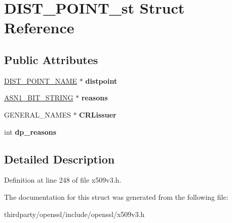\hypertarget{struct_d_i_s_t___p_o_i_n_t__st}{}\section{D\+I\+S\+T\+\_\+\+P\+O\+I\+N\+T\+\_\+st Struct Reference}
\label{struct_d_i_s_t___p_o_i_n_t__st}
\subsection*{Public Attributes}
\begin{DoxyCompactItemize}
\item 
\mbox{\label{struct_d_i_s_t___p_o_i_n_t__st_a8c519036ea9d52503225c5417b6239b8}} 
\hyperlink{struct_d_i_s_t___p_o_i_n_t___n_a_m_e__st}{D\+I\+S\+T\+\_\+\+P\+O\+I\+N\+T\+\_\+\+N\+A\+ME} $\ast$ {\bfseries distpoint}
\item 
\mbox{\label{struct_d_i_s_t___p_o_i_n_t__st_adadc29440678f7d0df1f8fb9319ba87c}} 
\hyperlink{structasn1__string__st}{A\+S\+N1\+\_\+\+B\+I\+T\+\_\+\+S\+T\+R\+I\+NG} $\ast$ {\bfseries reasons}
\item 
\mbox{\label{struct_d_i_s_t___p_o_i_n_t__st_a9dd08da439a604af4d6bc6cf68acf4f6}} 
G\+E\+N\+E\+R\+A\+L\+\_\+\+N\+A\+M\+ES $\ast$ {\bfseries C\+R\+Lissuer}
\item 
\mbox{\label{struct_d_i_s_t___p_o_i_n_t__st_a4f2ea5592417459b8d97a97515380a75}} 
int {\bfseries dp\+\_\+reasons}
\end{DoxyCompactItemize}


\subsection{Detailed Description}


Definition at line 248 of file x509v3.\+h.



The documentation for this struct was generated from the following file\+:\begin{DoxyCompactItemize}
\item 
thirdparty/openssl/include/openssl/x509v3.\+h\end{DoxyCompactItemize}
